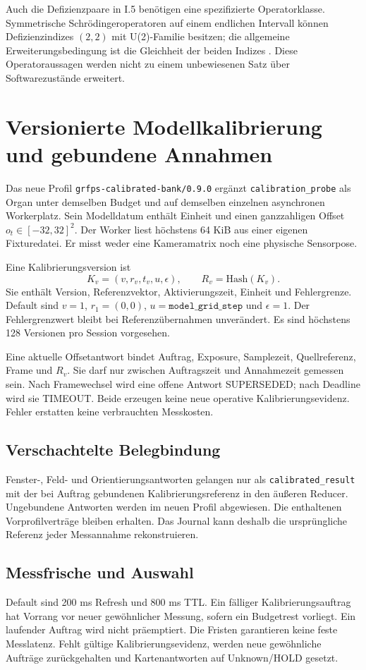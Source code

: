 \documentclass[11pt,a4paper]{article}
\newcommand{\nextsection}[2]{\clearpage{\color{accent}\small\textsf{#1}}\section{#2}}
\begin{document}
Auch die Defizienzpaare in I.5 benötigen eine spezifizierte
Operatorklasse. Symmetrische Schrödingeroperatoren auf einem
endlichen Intervall können Defizienzindizes $(2,2)$ mit U(2)-Familie
besitzen; die allgemeine Erweiterungsbedingung ist die Gleichheit
der beiden Indizes \cite{higuchi}. Diese Operatoraussagen werden
nicht zu einem unbewiesenen Satz über Softwarezustände erweitert.

\nextsection{52 / REFERENZVERTRAG}{Versionierte Modellkalibrierung und gebundene Annahmen}
Das neue Profil \texttt{grfps-calibrated-bank/0.9.0} ergänzt
\texttt{calibration\_probe} als Organ unter demselben Budget und
auf demselben einzelnen asynchronen Workerplatz. Sein Modelldatum
enthält Einheit und einen ganzzahligen Offset $o_t\in[-32,32]^2$.
Der Worker liest höchstens 64 KiB aus einer eigenen Fixturedatei.
Er misst weder eine Kameramatrix noch eine physische Sensorpose.

Eine Kalibrierungsversion ist
\[
 K_v=(v,r_v,t_v,u,\epsilon),\qquad
 R_v=\mathrm{Hash}(K_v).
\]
Sie enthält Version, Referenzvektor, Aktivierungszeit, Einheit
und Fehlergrenze. Default sind $v=1$, $r_1=(0,0)$,
$u=\texttt{model\_grid\_step}$ und $\epsilon=1$.
Der Fehlergrenzwert bleibt bei Referenzübernahmen unverändert.
Es sind höchstens 128 Versionen pro Session vorgesehen.

Eine aktuelle Offsetantwort bindet Auftrag, Exposure, Samplezeit,
Quellreferenz, Frame und $R_v$. Sie darf nur zwischen Auftragszeit
und Annahmezeit gemessen sein. Nach Framewechsel wird eine offene
Antwort SUPERSEDED; nach Deadline wird sie TIMEOUT. Beide erzeugen
keine neue operative Kalibrierungsevidenz. Fehler erstatten keine
verbrauchten Messkosten.

\subsection{Verschachtelte Belegbindung}
Fenster-, Feld- und Orientierungsantworten gelangen nur als
\texttt{calibrated\_result} mit der bei Auftrag gebundenen
Kalibrierungsreferenz in den äußeren Reducer. Ungebundene Antworten
werden im neuen Profil abgewiesen. Die enthaltenen Vorprofilverträge
bleiben erhalten. Das Journal kann deshalb die ursprüngliche
Referenz jeder Messannahme rekonstruieren.

\subsection{Messfrische und Auswahl}
Default sind 200 ms Refresh und 800 ms TTL. Ein fälliger
Kalibrierungsauftrag hat Vorrang vor neuer gewöhnlicher Messung,
sofern ein Budgetrest vorliegt. Ein laufender Auftrag wird nicht
präemptiert. Die Fristen garantieren keine feste Messlatenz.
Fehlt gültige Kalibrierungsevidenz, werden neue gewöhnliche
Aufträge zurückgehalten und Kartenantworten auf Unknown/HOLD gesetzt.
\end{document}
